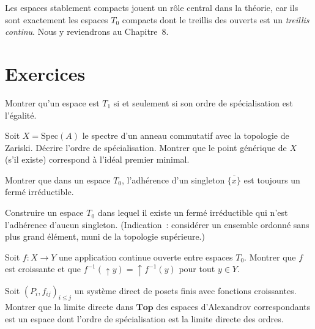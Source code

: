 \begin{remarque}
Les espaces stablement compacts jouent un r\^ole central dans la th\'eorie, car ils sont
exactement les espaces $T_0$ compacts dont le treillis des ouverts est un \emph{treillis
continu}. Nous y reviendrons au Chapitre~8.
\end{remarque}

\section{Exercices}

\begin{exercice}
Montrer qu'un espace est $T_1$ si et seulement si son ordre de sp\'ecialisation est
l'\'egalit\'e.
\end{exercice}

\begin{exercice}
Soit $X = \mathrm{Spec}(A)$ le spectre d'un anneau commutatif avec la topologie de Zariski.
D\'ecrire l'ordre de sp\'ecialisation. Montrer que le point g\'en\'erique de $X$ (s'il
existe) correspond \`a l'id\'eal premier minimal.
\end{exercice}

\begin{exercice}
Montrer que dans un espace $T_0$, l'adh\'erence d'un singleton $\overline{\{x\}}$ est
toujours un ferm\'e irr\'eductible.
\end{exercice}

\begin{exercice}
Construire un espace $T_0$ dans lequel il existe un ferm\'e irr\'eductible qui n'est
l'adh\'erence d'aucun singleton. (Indication~: consid\'erer un ensemble ordonn\'e sans
plus grand \'el\'ement, muni de la topologie sup\'erieure.)
\end{exercice}

\begin{exercice}
Soit $f\colon X \to Y$ une application continue ouverte entre espaces $T_0$.
Montrer que $f$ est croissante et que $f^{-1}(\uparrow\! y) = \uparrow\! f^{-1}(y)$
pour tout $y \in Y$.
\end{exercice}

\begin{exercice}
Soit $(P_i, f_{ij})_{i \leq j}$ un syst\`eme direct de posets finis avec fonctions
croissantes. Montrer que la limite directe dans $\mathbf{Top}$ des espaces d'Alexandrov
correspondants est un espace dont l'ordre de sp\'ecialisation est la limite directe des
ordres.
\end{exercice}
